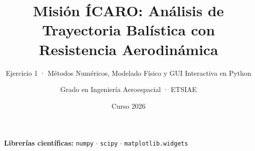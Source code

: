 \documentclass[aspectratio=169, 10pt]{beamer}
\title[Misión ÍCARO · PEI2]{Misión ÍCARO: Análisis de Trayectoria Balística con Resistencia Aerodinámica}
\subtitle{Ejercicio 1 · Métodos Numéricos, Modelado Físico y GUI Interactiva en Python}
\author[ETSIAE · Programación]{Grado en Ingeniería Aeroespacial · ETSIAE}
\date{Curso 2026}
\begin{document}
\begin{frame}[plain]
    \titlepage
    \begin{center}
        \vspace{-0.4cm}
        \small \textcolor{AeroBlue}{\textbf{Librerías científicas:} \texttt{numpy} $\cdot$ \texttt{scipy} $\cdot$ \texttt{matplotlib.widgets}}
    \end{center}
\end{frame}

\end{document}
